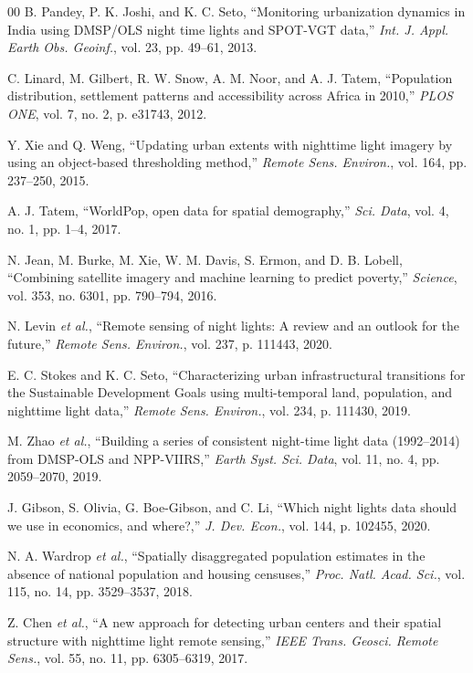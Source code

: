 \documentclass[conference]{IEEEtran}
\begin{document}
\begin{thebibliography}{00}
B. Pandey, P. K. Joshi, and K. C. Seto, ``Monitoring urbanization dynamics in India using DMSP/OLS night time lights and SPOT-VGT data,'' \textit{Int. J. Appl. Earth Obs. Geoinf.}, vol. 23, pp. 49--61, 2013.

C. Linard, M. Gilbert, R. W. Snow, A. M. Noor, and A. J. Tatem, ``Population distribution, settlement patterns and accessibility across Africa in 2010,'' \textit{PLOS ONE}, vol. 7, no. 2, p. e31743, 2012.

Y. Xie and Q. Weng, ``Updating urban extents with nighttime light imagery by using an object-based thresholding method,'' \textit{Remote Sens. Environ.}, vol. 164, pp. 237--250, 2015.

A. J. Tatem, ``WorldPop, open data for spatial demography,'' \textit{Sci. Data}, vol. 4, no. 1, pp. 1--4, 2017.

N. Jean, M. Burke, M. Xie, W. M. Davis, S. Ermon, and D. B. Lobell, ``Combining satellite imagery and machine learning to predict poverty,'' \textit{Science}, vol. 353, no. 6301, pp. 790--794, 2016.

N. Levin \textit{et al.}, ``Remote sensing of night lights: A review and an outlook for the future,'' \textit{Remote Sens. Environ.}, vol. 237, p. 111443, 2020.

E. C. Stokes and K. C. Seto, ``Characterizing urban infrastructural transitions for the Sustainable Development Goals using multi-temporal land, population, and nighttime light data,'' \textit{Remote Sens. Environ.}, vol. 234, p. 111430, 2019.

M. Zhao \textit{et al.}, ``Building a series of consistent night-time light data (1992--2014) from DMSP-OLS and NPP-VIIRS,'' \textit{Earth Syst. Sci. Data}, vol. 11, no. 4, pp. 2059--2070, 2019.

J. Gibson, S. Olivia, G. Boe-Gibson, and C. Li, ``Which night lights data should we use in economics, and where?,'' \textit{J. Dev. Econ.}, vol. 144, p. 102455, 2020.

N. A. Wardrop \textit{et al.}, ``Spatially disaggregated population estimates in the absence of national population and housing censuses,'' \textit{Proc. Natl. Acad. Sci.}, vol. 115, no. 14, pp. 3529--3537, 2018.

Z. Chen \textit{et al.}, ``A new approach for detecting urban centers and their spatial structure with nighttime light remote sensing,'' \textit{IEEE Trans. Geosci. Remote Sens.}, vol. 55, no. 11, pp. 6305--6319, 2017.


\end{thebibliography}
\end{document}
